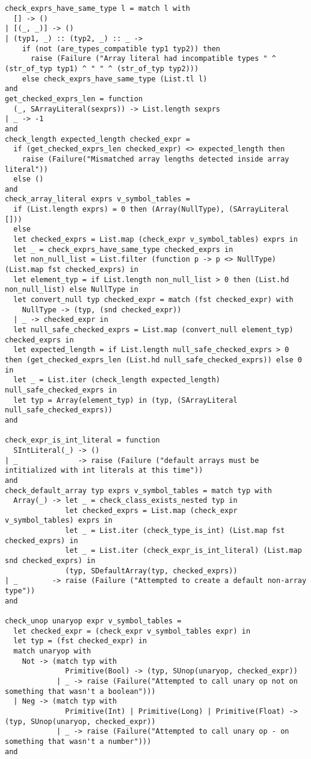 \documentclass{article}
\begin{document}
\begin{verbatim}
check_exprs_have_same_type l = match l with
  [] -> ()
| [(_, _)] -> ()
| (typ1, _) :: (typ2, _) :: _ ->
    if (not (are_types_compatible typ1 typ2)) then
      raise (Failure ("Array literal had incompatible types " ^ (str_of_typ typ1) ^ " " ^ (str_of_typ typ2)))
    else check_exprs_have_same_type (List.tl l)
and
get_checked_exprs_len = function
  (_, SArrayLiteral(sexprs)) -> List.length sexprs
| _ -> -1
and
check_length expected_length checked_expr =
  if (get_checked_exprs_len checked_expr) <> expected_length then
    raise (Failure("Mismatched array lengths detected inside array literal"))
  else ()
and
check_array_literal exprs v_symbol_tables =
  if (List.length exprs) = 0 then (Array(NullType), (SArrayLiteral []))
  else
  let checked_exprs = List.map (check_expr v_symbol_tables) exprs in
  let _ = check_exprs_have_same_type checked_exprs in
  let non_null_list = List.filter (function p -> p <> NullType) (List.map fst checked_exprs) in
  let element_typ = if List.length non_null_list > 0 then (List.hd non_null_list) else NullType in
  let convert_null typ checked_expr = match (fst checked_expr) with
    NullType -> (typ, (snd checked_expr))
  | _ -> checked_expr in
  let null_safe_checked_exprs = List.map (convert_null element_typ) checked_exprs in
  let expected_length = if List.length null_safe_checked_exprs > 0 then (get_checked_exprs_len (List.hd null_safe_checked_exprs)) else 0 in
  let _ = List.iter (check_length expected_length) null_safe_checked_exprs in
  let typ = Array(element_typ) in (typ, (SArrayLiteral null_safe_checked_exprs))
and

check_expr_is_int_literal = function
  SIntLiteral(_) -> ()
| _              -> raise (Failure ("default arrays must be intitialized with int literals at this time"))
and
check_default_array typ exprs v_symbol_tables = match typ with
  Array(_) -> let _ = check_class_exists_nested typ in
              let checked_exprs = List.map (check_expr v_symbol_tables) exprs in
              let _ = List.iter (check_type_is_int) (List.map fst checked_exprs) in
              let _ = List.iter (check_expr_is_int_literal) (List.map snd checked_exprs) in
              (typ, SDefaultArray(typ, checked_exprs))
| _        -> raise (Failure ("Attempted to create a default non-array type"))
and

check_unop unaryop expr v_symbol_tables =
  let checked_expr = (check_expr v_symbol_tables expr) in
  let typ = (fst checked_expr) in
  match unaryop with
    Not -> (match typ with
              Primitive(Bool) -> (typ, SUnop(unaryop, checked_expr))
            | _ -> raise (Failure("Attempted to call unary op not on something that wasn't a boolean")))
  | Neg -> (match typ with
              Primitive(Int) | Primitive(Long) | Primitive(Float) -> (typ, SUnop(unaryop, checked_expr))
            | _ -> raise (Failure("Attempted to call unary op - on something that wasn't a number")))
and


\end{verbatim}
\end{document}
